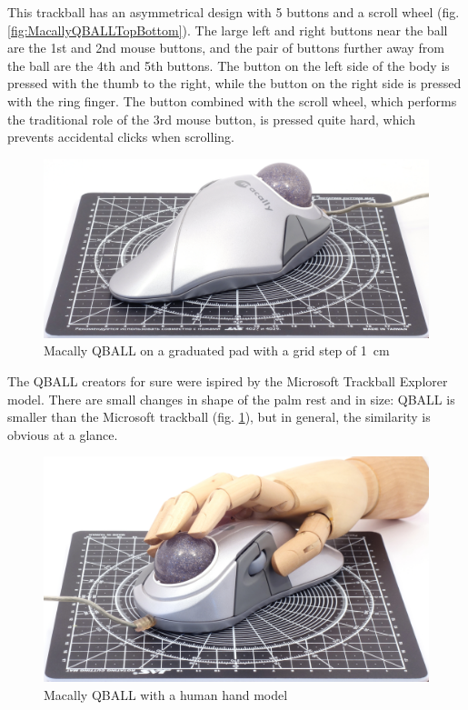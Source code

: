 \documentclass[11pt, a4paper]{article}
\begin{document}
This trackball has an asymmetrical design with 5 buttons and a scroll wheel (fig. \ref{fig:MacallyQBALLTopBottom}).
The large left and right buttons near the ball are the 1st and 2nd mouse buttons, and the pair of buttons further away from the ball are the 4th and 5th buttons.
The button on the left side of the body is pressed with the thumb to the right, while the button on the right side is pressed with the ring finger. The button combined with the scroll wheel, which performs the traditional role of the 3rd mouse button, is pressed quite hard, which prevents accidental clicks when scrolling.

\begin{figure}[h]
    \centering
    \includegraphics[scale=0.5]{2001_macally_qball/size_30.jpg}
    \caption{Macally QBALL on a graduated pad with a grid step of 1~cm}
    \label{fig:MacallyQBALLSize}
\end{figure}

The QBALL creators for sure were ispired by the Microsoft Trackball Explorer model. There are small changes in shape of the palm rest and in size: QBALL is smaller than the Microsoft trackball (fig. \ref{fig:MacallyQBALLSize}), but in general, the similarity is obvious at a glance.

\begin{figure}[h]
    \centering
    \includegraphics[scale=0.5]{2001_macally_qball/hand_30.jpg}
    \caption{Macally QBALL with a human hand model}
    \label{fig:MacallyQBALLHand}
\end{figure}
\end{document}
